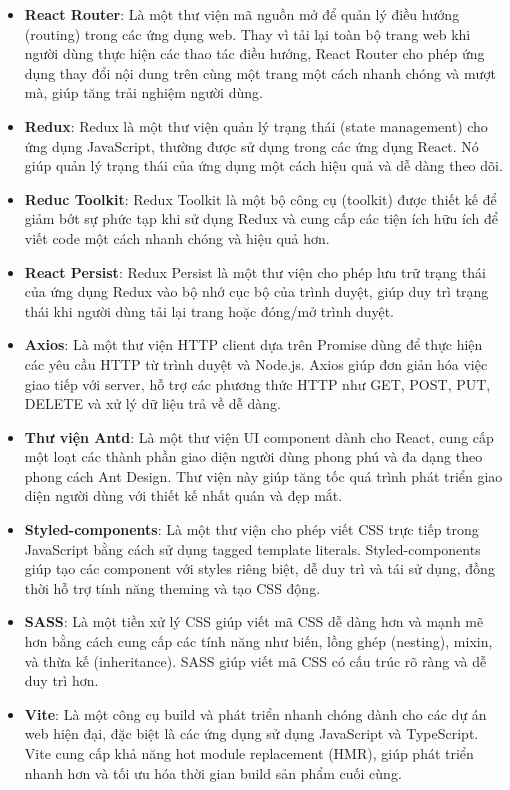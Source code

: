\begin{itemize}
    \item \textbf{React Router}: Là một thư viện mã nguồn mở để quản lý điều hướng (routing) trong các ứng dụng
    web. Thay vì tải lại toàn bộ trang web khi người dùng thực hiện các thao tác điều hướng, React
    Router cho phép ứng dụng thay đổi nội dung trên cùng một trang một cách nhanh chóng và mượt
    mà, giúp tăng trải nghiệm người dùng.
    \item \textbf{Redux}: Redux là một thư viện quản lý trạng thái (state management) cho ứng dụng JavaScript, thường được sử dụng trong các ứng dụng React. Nó giúp quản lý trạng thái của ứng dụng một cách hiệu quả và dễ dàng theo dõi.
    \item \textbf{Reduc Toolkit}: Redux Toolkit là một bộ công cụ (toolkit) được thiết kế để giảm bớt sự phức tạp khi sử dụng Redux và cung cấp các tiện ích hữu ích để viết code một cách nhanh chóng và hiệu quả hơn. 
    \item \textbf{React Persist}: Redux Persist là một thư viện cho phép lưu trữ trạng thái của ứng dụng Redux vào bộ nhớ cục bộ của trình duyệt, giúp duy trì trạng thái khi người dùng tải lại trang hoặc đóng/mở trình duyệt.
    \item \textbf{Axios}: Là một thư viện HTTP client dựa trên Promise dùng để thực hiện các yêu cầu HTTP từ trình duyệt và Node.js. Axios giúp đơn giản hóa việc giao tiếp với server, hỗ trợ các phương thức HTTP như GET, POST, PUT, DELETE và xử lý dữ liệu trả về dễ dàng.
    \item \textbf{Thư viện Antd}: Là một thư viện UI component dành cho React, cung cấp một loạt các thành phần giao diện người dùng phong phú và đa dạng theo phong cách Ant Design. Thư viện này giúp tăng tốc quá trình phát triển giao diện người dùng với thiết kế nhất quán và đẹp mắt.
    \item \textbf{Styled-components}: Là một thư viện cho phép viết CSS trực tiếp trong JavaScript bằng cách sử dụng tagged template literals. Styled-components giúp tạo các component với styles riêng biệt, dễ duy trì và tái sử dụng, đồng thời hỗ trợ tính năng theming và tạo CSS động.
    \item \textbf{SASS}: Là một tiền xử lý CSS giúp viết mã CSS dễ dàng hơn và mạnh mẽ hơn bằng cách cung cấp các tính năng như biến, lồng ghép (nesting), mixin, và thừa kế (inheritance). SASS giúp viết mã CSS có cấu trúc rõ ràng và dễ duy trì hơn.
    \item \textbf{Vite}: Là một công cụ build và phát triển nhanh chóng dành cho các dự án web hiện đại, đặc biệt là các ứng dụng sử dụng JavaScript và TypeScript. Vite cung cấp khả năng hot module replacement (HMR), giúp phát triển nhanh hơn và tối ưu hóa thời gian build sản phẩm cuối cùng.

\end{itemize}
